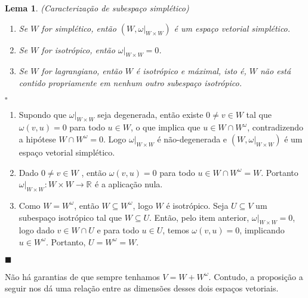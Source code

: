 \documentclass[12pt]{book}
\newtheorem{lema}[teorema]{Lema}
\newenvironment{prova}[1]{$\square$ #1}{\hfill$\blacksquare$}
\newcommand{\espacoSimpleticoOrtogonal}[1]{#1^{\omega}}
\newcommand{\real}[1]{\mathbb{R}^{#1}}
\newcommand{\reta}{\real{}}
\begin{document}
	\begin{lema}\label{lema_subespaco_simpletico_ortogonal}
		(Caracterização de subespaço simplético)
		\begin{enumerate}
			\item Se $W$ for simplético, então $(W, \omega|_{W \times W})$ é um espaço vetorial simplético.
			
			\item Se $W$ for isotrópico, então $\omega|_{W\times W} = 0$.
			
			\item Se $W$ for lagrangiano, então $W$ é isotrópico e máximal, isto é, $W$ não está contido propriamente em nenhum outro subespaço isotrópico. 
		\end{enumerate}
	\end{lema}
	\begin{prova}
		\begin{enumerate}
			\item Supondo que $\omega|_{W \times W}$ seja degenerada, então existe $0\neq v \in W$ tal que $\omega(v, u ) = 0$ para todo $u \in W$, o que implica que $u \in W\cap W^{\omega}$, contradizendo a hipótese $W\cap W^{\omega} =0$. Logo $\omega|_{W \times W} $ é não-degenerada e $(W, \omega|_{W \times W})$ é um espaço vetorial simplético.
			
			\item Dado $0\neq v \in W $ , então $\omega(v,u) = 0$ para todo $u \in W\cap W^{\omega} = W$. Portanto $\omega|_{W\times W}: W\times W \to \reta$ é a aplicação nula.
			
			\item  Como $W=W^{\omega}$, então $W\subseteq W^{\omega}$, logo $W$ é isotrópico. Seja $U \subseteq V$ um subespaço isotrópico tal que $W \subseteq U$. Então, pelo item anterior, $\omega|_{W \times W} = 0$, logo dado $v \in W \cap U$ e para todo $u \in U$, temos $\omega(v, u) = 0$, implicando $u \in W^{\omega}$. Portanto, $U = W^{\omega} = W$.
		\end{enumerate}
	\end{prova}
	
	Não há garantias de que sempre tenhamos $V = W + \espacoSimpleticoOrtogonal{W}$. Contudo, a proposição a seguir nos dá uma relação entre as dimensões desses dois espaços vetoriais.
	
\end{document}
